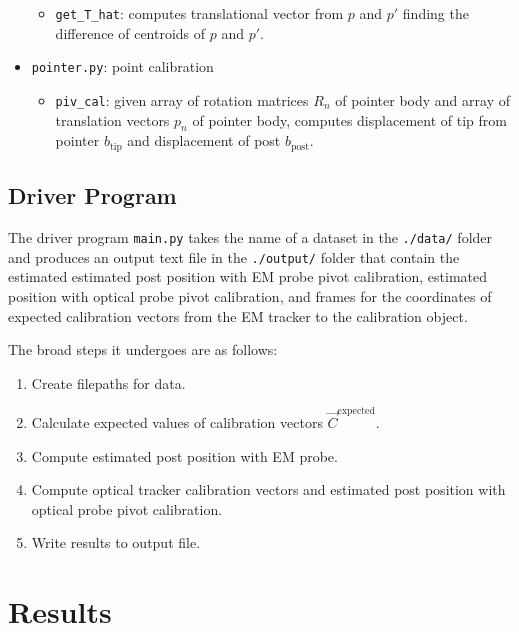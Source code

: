\documentclass[12pt,letterpaper]{scrartcl}
\begin{document}
\begin{itemize}
\begin{itemize}
            \item \texttt{get\_T\_hat}: computes translational vector from $p$ and $p'$ finding the difference of centroids of $p$ and $p'$.
        \end{itemize}
        \item \texttt{pointer.py}: point calibration
        \begin{itemize}
            \item \texttt{piv\_cal}: given array of rotation matrices $R_n$ of pointer body and array of translation vectors $p_n$ of pointer body, computes displacement of tip from pointer $b_\text{tip}$ and displacement of post $b_\text{post}$.
        \end{itemize}
    \end{itemize}
    \subsection{Driver Program}
    The driver program \texttt{main.py} takes the name of a dataset in the \texttt{./data/} folder and produces an output text file in the \texttt{./output/} folder that contain the estimated estimated post position with EM probe pivot calibration, estimated position with optical probe pivot calibration, and frames for the coordinates of expected calibration vectors from the EM tracker to the calibration object.
    
    The broad steps it undergoes are as follows:
    \begin{enumerate}
        \item Create filepaths for data.
        \item Calculate expected values of calibration vectors $\vec{C}^\text{expected}$.
        \item Compute estimated post position with EM probe.
        \item Compute optical tracker calibration vectors and estimated post position with optical probe pivot calibration.
        \item Write results to output file.
    \end{enumerate}
    \section{Results}
\end{document}
